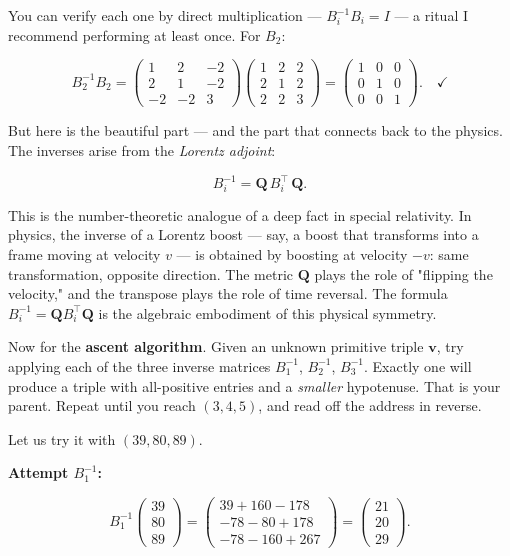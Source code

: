 \documentclass[11pt,openright,twoside]{book}
\theoremstyle{definition}
\begin{document}
You can verify each one by direct multiplication --- $B_i^{-1} B_i = I$ --- a ritual I recommend performing at least once. For $B_2$:

\[B_2^{-1} B_2 = \begin{pmatrix} 1 & 2 & -2 \\ 2 & 1 & -2 \\ -2 & -2 & 3 \end{pmatrix} \begin{pmatrix} 1 & 2 & 2 \\ 2 & 1 & 2 \\ 2 & 2 & 3 \end{pmatrix} = \begin{pmatrix} 1 & 0 & 0 \\ 0 & 1 & 0 \\ 0 & 0 & 1 \end{pmatrix}. \quad \checkmark\]

But here is the beautiful part --- and the part that connects back to the physics. The inverses arise from the \textit{Lorentz adjoint}:

\[B_i^{-1} = \mathbf{Q} \, B_i^\top \, \mathbf{Q}.\]

This is the number-theoretic analogue of a deep fact in special relativity. In physics, the inverse of a Lorentz boost --- say, a boost that transforms into a frame moving at velocity $v$ --- is obtained by boosting at velocity $-v$: same transformation, opposite direction. The metric $\mathbf{Q}$ plays the role of "flipping the velocity," and the transpose plays the role of time reversal. The formula $B_i^{-1} = \mathbf{Q} B_i^\top \mathbf{Q}$ is the algebraic embodiment of this physical symmetry.

Now for the \textbf{ascent algorithm}. Given an unknown primitive triple $\mathbf{v}$, try applying each of the three inverse matrices $B_1^{-1}$, $B_2^{-1}$, $B_3^{-1}$. Exactly one will produce a triple with all-positive entries and a \textit{smaller} hypotenuse. That is your parent. Repeat until you reach $(3, 4, 5)$, and read off the address in reverse.

Let us try it with $(39, 80, 89)$.

\textbf{Attempt $B_1^{-1}$:}

\[B_1^{-1} \begin{pmatrix} 39 \\ 80 \\ 89 \end{pmatrix} = \begin{pmatrix} 39 + 160 - 178 \\ -78 - 80 + 178 \\ -78 - 160 + 267 \end{pmatrix} = \begin{pmatrix} 21 \\ 20 \\ 29 \end{pmatrix}.\]
\end{document}
